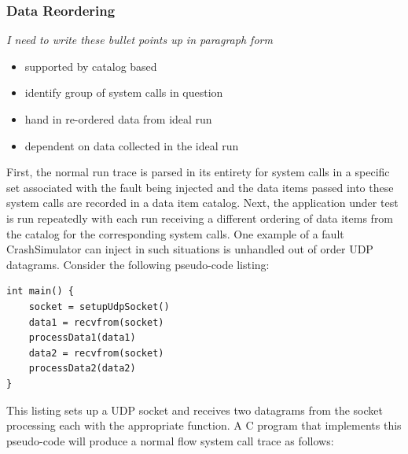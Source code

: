         \subsubsection{Data Reordering}

        \emph{I need to write these bullet points up in paragraph form}
        \begin{itemize}
            \item{supported by catalog based}
            \item{identify group of system calls in question}
            \item{hand in re-ordered data from ideal run}
            \item{dependent on data collected in the ideal run}
        \end{itemize}


            First, the normal run trace is parsed in its entirety for system calls in a specific set
            associated with the fault being injected and the data items passed into these system calls are recorded in a
            data item catalog. Next, the application under test is run repeatedly with each run receiving a different
            ordering of data items from the catalog for the corresponding system calls. One example of a fault
            CrashSimulator can inject in such situations is unhandled out of order UDP datagrams. Consider the following
            pseudo-code listing:

            \begin{verbatim}
int main() {
    socket = setupUdpSocket()
    data1 = recvfrom(socket)
    processData1(data1)
    data2 = recvfrom(socket)
    processData2(data2)
}
            \end{verbatim}

            This listing sets up a UDP socket and receives two datagrams from the socket processing each with the
            appropriate function. A C program that implements this pseudo-code will produce a normal flow system call trace
            as follows:

